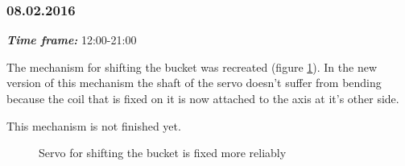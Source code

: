 \subsubsection{08.02.2016}
\textit{\textbf{Time frame:}} 12:00-21:00 

The mechanism for shifting the bucket was recreated (figure \ref{Shiftbuc2.8}). In the new version of this mechanism the shaft of the servo doesn't suffer from bending because the coil that is fixed on it is now attached to the axis at it's other side. 

This mechanism is not finished yet.

\begin{figure}[H]
	\begin{minipage}[h]{1\linewidth}
		\caption{Servo for shifting the bucket is fixed more reliably}
		\label{Shiftbuc2.8}
	\end{minipage}
\end{figure}
